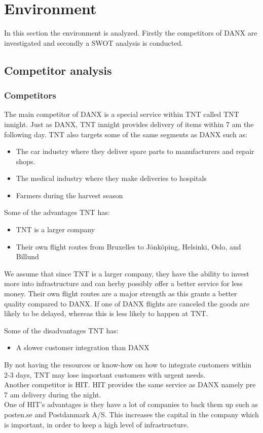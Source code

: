 \section{Environment}
In this section the environment is analyzed. Firstly the competitors of DANX are investigated and secondly a SWOT analysis is conducted.
\subsection{Competitor analysis}
\label{sub:competitor_analysis}
\subsubsection{Competitors}
The main competitor of DANX is a special service within TNT called TNT innight.\cite{webpage001}
Just as DANX, TNT innight provides delivery of items within 7 am the following day.
TNT also targets some of the same segments as DANX such as:

\begin{itemize}
\item The car industry where they deliver spare parts to manufacturers and repair shops.
\item The medical industry where they make deliveries to hospitals
\item Farmers during the harvest season
\end{itemize}

Some of the advantages TNT has:
\begin{itemize}
\item TNT is a larger company\cite{tnt002}
\item Their own flight routes\cite{webpage001} from Bruxelles to Jönköping, Helsinki, Oslo, and Billund
\end{itemize}

We assume that since TNT is a larger company, they have the ability to invest more into infrastructure and can herby possibly offer a better service for less money.
Their own flight routes are a major strength as this grants a better quality compared to DANX. If one of DANX flights are canceled the goods are likely to be delayed, whereas this is less likely to happen at TNT.

Some of the disadvantages TNT has:
\begin{itemize}
\item A slower customer integration than DANX\cite{tnt001}
\end{itemize}

By not having the resources or know-how on how to integrate customers within 2-3 days, TNT may lose important customers with urgent needs.\\
Another competitor is HIT.\cite{malene001}\cite{webpage002} HIT provides the same service as DANX namely pre 7 am delivery during the night.\\
One of HIT’s advantages is they have a lot of companies to back them up such as posten.se and Postdanmark A/S.\cite{webpage002}\cite{webpage012} This increases the capital in the company which is important, in order to keep a high level of infrastructure.

